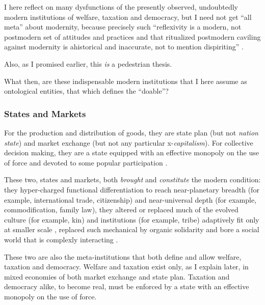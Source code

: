 \begin{enumerate}
	I here reflect on many dysfunctions of the presently observed, undoubtedly modern institutions of welfare, taxation and democracy, but I need not get ``all meta'' about modernity, because precisely such ``reflexivity is a modern, not postmodern set of attitudes and practices and that ritualized postmodern caviling against modernity is ahistorical and inaccurate, not to mention dispiriting'' \citep[1119]{Sica-1997-aa}. 
	
	Also, as I promised earlier, this \emph{is} a pedestrian thesis.
\end{enumerate}

What then, are these indispensable modern institutions that I here assume as ontological entities, that which defines the ``doable''? 

\subsubsection{States and Markets}
For the production and distribution of goods, they are state plan (but not \emph{nation state}) and market exchange (but not any particular x-\emph{capitalism}). 
For collective decision making, they are a state equipped with an effective monopoly on the use of force and devoted to some popular participation \citep[compare][96]{Giddens1998}.

These two, states and markets, both \emph{brought} and \emph{constitute} the modern condition: they hyper-charged functional differentiation \citep{Smith-1776-lq} to reach near-planetary breadth (for example, international trade, citizenship) and near-universal depth (for example, commodification, family law), they altered or replaced much of the evolved culture (for example, kin) and institutions (for example, tribe) adaptively fit only at smaller scale \citep{Diamond1997}, replaced such mechanical by organic solidarity \citep{Durkheim-1893-aa} and bore a social world that is complexly interacting \citep[for example,][]{Merton-1968-aa,Merton-1936-aa}. 

These two are also the meta-institutions that both define and allow welfare, taxation and democracy. 
Welfare and taxation exist only, as I explain later, in mixed economies of both market exchange and state plan. 
Taxation and democracy alike, to become real, must be enforced by a state with an effective monopoly on the use of force.%
	
